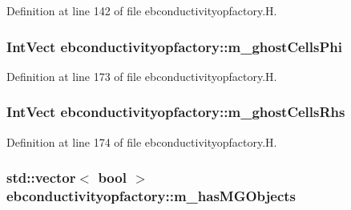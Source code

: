 Definition at line 142 of file ebconductivityopfactory.\+H.

\subsubsection[{\texorpdfstring{m\+\_\+ghost\+Cells\+Phi}{m_ghostCellsPhi}}]{\setlength{\rightskip}{0pt plus 5cm}Int\+Vect ebconductivityopfactory\+::m\+\_\+ghost\+Cells\+Phi\hspace{0.3cm}{\ttfamily [protected]}}\hypertarget{classebconductivityopfactory_a1d2e588bf687d5ba9baf9f093b7c519d}{}\label{classebconductivityopfactory_a1d2e588bf687d5ba9baf9f093b7c519d}


Definition at line 173 of file ebconductivityopfactory.\+H.

\subsubsection[{\texorpdfstring{m\+\_\+ghost\+Cells\+Rhs}{m_ghostCellsRhs}}]{\setlength{\rightskip}{0pt plus 5cm}Int\+Vect ebconductivityopfactory\+::m\+\_\+ghost\+Cells\+Rhs\hspace{0.3cm}{\ttfamily [protected]}}\hypertarget{classebconductivityopfactory_ad37221eae09485be07cc91246559ee22}{}\label{classebconductivityopfactory_ad37221eae09485be07cc91246559ee22}


Definition at line 174 of file ebconductivityopfactory.\+H.

\subsubsection[{\texorpdfstring{m\+\_\+has\+M\+G\+Objects}{m_hasMGObjects}}]{\setlength{\rightskip}{0pt plus 5cm}std\+::vector$<$ bool $>$ ebconductivityopfactory\+::m\+\_\+has\+M\+G\+Objects\hspace{0.3cm}{\ttfamily [protected]}}\hypertarget{classebconductivityopfactory_a237047b2d5f2b0cd5e48578ff13f1b85}{}\label{classebconductivityopfactory_a237047b2d5f2b0cd5e48578ff13f1b85}


